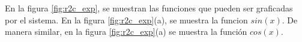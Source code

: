 \documentclass[conference]{IEEEtran}
\begin{document}
%
%
En la figura \ref{fig:r2c_exp}, se muestran las funciones que pueden ser graficadas por el sistema. En la figura \ref{fig:r2c_exp}(a), se muestra la funcion $sin(x)$. De manera similar, en la figura \ref{fig:r2c_exp}(a) se muestra la función $cos(x)$.   

% 
\begin{figure}
\\

\end{figure}
\end{document}
